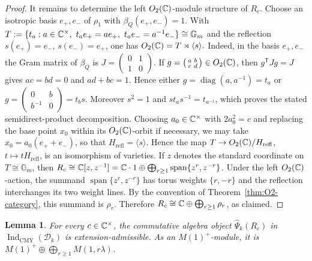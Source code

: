 \documentclass[10pt,a4paper]{amsart}
\numberwithin{equation}{section} \newtheorem{thm}{Theorem}[section] \newtheorem{lem}[thm]{Lemma} \newtheorem{ex}[thm]{Example} \newtheorem{prop}[thm]{Proposition} \newtheorem{cor}[thm]{Corollary} \newtheorem{defi}[thm]{Definition} \newtheorem{rmk}[thm]{Remark} \newtheorem{notation}[thm]{Notation}
\newcommand{\Dk}{\mathcal D_k}
\newcommand{\IndCMY}{\operatorname{Ind}_{\mathrm{CMY}}}
\newcommand{\Otwo}{O_2(\C)}
\begin{document}
\begin{proof}
It remains to determine the left $\Otwo$-module structure of $R_c$. Choose an isotropic basis $e_+,e_-$ of $\rho_1$ with \(\beta_Q(e_+,e_-)=1\). With \(T:=\{t_a:a\in\C^\times,\ t_a e_+=ae_+,\ t_a e_-=a^{-1}e_-\} \cong\mathbb G_m\) and the reflection $s(e_+)=e_-$, $s(e_-)=e_+$, one has \(\Otwo=T\rtimes\langle s\rangle.\) Indeed, in the basis $e_+,e_-$ the Gram matrix of $\beta_Q$ is \(J=\left(\begin{smallmatrix}0&1\\1&0\end{smallmatrix}\right)\). If \(g=\left(\begin{smallmatrix}a&b\\c&d\end{smallmatrix}\right)\in\Otwo\), then $g^{\mathsf T}Jg=J$ gives \(ac=bd=0\) and \(ad+bc=1\). Hence either \(g=\operatorname{diag}(a,a^{-1})=t_a\) or \(g=\left(\begin{smallmatrix}0&b\\b^{-1}&0\end{smallmatrix}\right)=t_b s\). Moreover $s^2=1$ and $st_as^{-1}=t_{a^{-1}}$, which proves the stated semidirect-product decomposition. Choosing $a_0\in\mathbb{C}^\times$ with $2a_0^2=c$ and replacing the base point $x_0$ within its $\Otwo$-orbit if necessary, we may take \(x_0=a_0(e_++e_-)\), so that \(H_{\mathrm{refl}}=\langle s\rangle.\) Hence the map $T\to\Otwo/H_{\mathrm{refl}}$, $t\mapsto tH_{\mathrm{refl}}$, is an isomorphism of varieties. If $z$ denotes the standard coordinate on $T\cong\mathbb G_m$, then \(R_c\cong\mathbb{C}[z,z^{-1}] =\mathbb{C}\cdot1\oplus\bigoplus_{r\ge1}\operatorname{span}\{z^r,z^{-r}\}\). Under the left $\Otwo$-action, the summand $\operatorname{span}\{z^r,z^{-r}\}$ has torus weights $\{r,-r\}$ and the reflection interchanges its two weight lines. By the convention of Theorem~\ref{thm:O2-category}, this summand is $\rho_r$. Therefore \(R_c\cong\mathbb{C}\oplus\bigoplus_{r\ge1}\rho_r\), as claimed.
\end{proof}

\begin{lem}\label{lem:O2-admissible}
For every $c\in\mathbb{C}^\times$, the commutative algebra object $\widehat\Psi_k(R_c)$ in $\IndCMY(\Dk)$ is extension-admissible. As an $M(1)^+$-module, it is \(M(1)^+\oplus\bigoplus_{r\ge1}M(1,r\lambda)\).
\end{lem}
\end{document}
